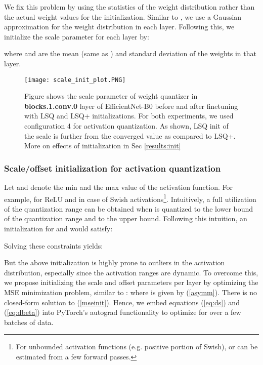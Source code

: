 \documentclass[10pt,twocolumn,letterpaper]{article}
\begin{document}
We fix this problem by using the statistics of the weight distribution rather than the actual weight values for the initialization. Similar to \cite{dfq}, we use a Gaussian approximation for the weight distribution in each layer. Following this, we initialize the scale parameter for each layer by:

where  and  are the mean (same as ) and standard deviation of the weights in that layer.

\begin{figure}
    \centering
    \texttt{[image: scale\_init\_plot.PNG]}
    \caption{Figure shows the scale parameter of weight quantizer in \textbf{blocks.1.conv.0} layer of EfficientNet-B0 before and after finetuning with LSQ and LSQ+ initializations. For both experiments, we used configuration 4 for activation quantization. As shown, LSQ init of the scale is further from the converged value as compared to LSQ+. More on effects of initialization in Sec \ref{results:init}}
    \label{fig:scale_init}
\end{figure}

\subsubsection{Scale/offset initialization for activation quantization}
Let  and  denote the min and the max value of the activation function. For example,  for ReLU and  in case of Swish activations\footnote{For unbounded activation functions (e.g. positive portion of Swish),  or  can be estimated from a few forward passes.}. Intuitively, a full utilization of the quantization range can be obtained when  is quantized to the lower bound of the quantization range and  to the upper bound. Following this intuition, an initialization for  and  would satisfy:

Solving these constraints yields:


But the above initialization is highly prone to outliers in the activation distribution, especially since the activation ranges are dynamic. To overcome this, we propose initializing the scale and offset parameters per layer by optimizing the MSE minimization problem, similar to \cite{mse1,mse3}:
where  is given by (\ref{asymm}). There is no closed-form solution to (\ref{mseinit}). Hence, we embed equations (\ref{eq:ds}) and (\ref{eq:dbeta}) into PyTorch's autograd functionality to optimize for  over a few batches of data.
\end{document}
